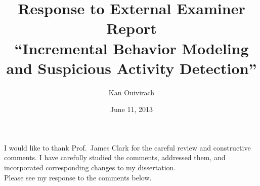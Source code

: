 \documentclass{article}
\title{\textbf{Response to External Examiner Report}\\[0.5em] 
    {\small ``Incremental Behavior 
    Modeling and Suspicious Activity Detection''}}
\author{Kan Ouivirach}
\date{June 11, 2013}
\begin{document}
\maketitle

\noindent
I would like to thank Prof.\ James Clark for
the careful review and constructive comments. I have
carefully studied the comments, addressed them, and incorporated
corresponding changes to my dissertation. \\ 






\noindent Please see my response to the comments below.

\vspace{0.5cm}
\end{document}
